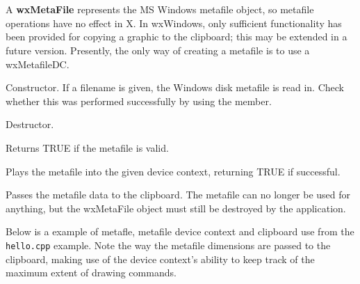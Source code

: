 
\section{}\label{wxmetafile}

A {\bf wxMetaFile} represents the MS Windows metafile object, so metafile
operations have no effect in X. In wxWindows, only sufficient functionality
has been provided for copying a graphic to the clipboard; this may be extended
in a future version. Presently, the only way of creating a metafile
is to use a wxMetafileDC.








Constructor. If a filename is given, the Windows disk metafile is
read in. Check whether this was performed successfully by
using the  member.



Destructor.

\label{wxmetafileok}


Returns TRUE if the metafile is valid.

\label{wxmetafileplay}


Plays the metafile into the given device context, returning
TRUE if successful.



Passes the metafile data to the clipboard. The metafile can no longer be
used for anything, but the wxMetaFile object must still be destroyed by
the application.

Below is a example of metafle, metafile device context and clipboard use
from the {\tt hello.cpp} example. Note the way the metafile dimensions
are passed to the clipboard, making use of the device context's ability
to keep track of the maximum extent of drawing commands.

